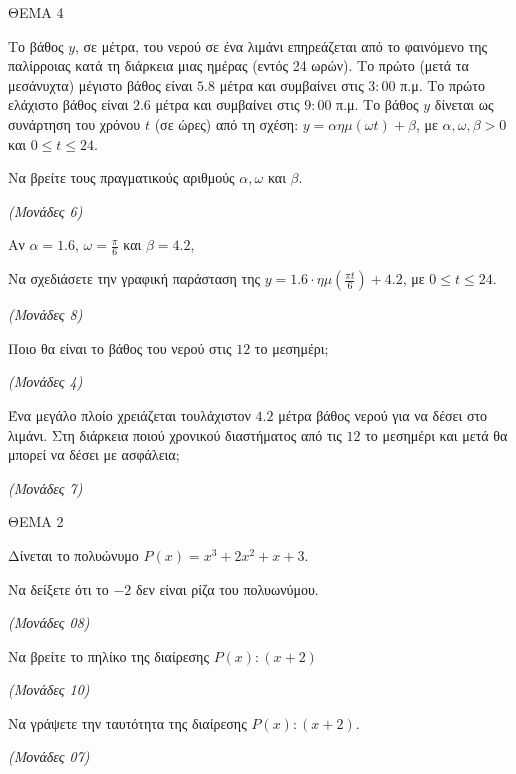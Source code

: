 \documentclass[11pt,a4paper,twoside]{book}
\newcommand{\monades}[1]{\hfill \textit{(Μονάδες #1)}}
\begin{document}
ΘΕΜΑ 4

Το βάθος $y$, σε μέτρα, του νερού σε ένα λιμάνι επηρεάζεται από το φαινόμενο της παλίρροιας κατά τη διάρκεια μιας ημέρας (εντός 24 ωρών). Το πρώτο (μετά τα μεσάνυχτα) μέγιστο βάθος είναι $5.8$ μέτρα και συμβαίνει στις $3:00$ π.μ. Το πρώτο ελάχιστο βάθος είναι $2.6$ μέτρα και συμβαίνει στις $9:00$ π.μ. Το βάθος $y$ δίνεται ως συνάρτηση του χρόνου $t$ (σε ώρες) από τη σχέση: $y = \alpha\eta\mu(\omega t) + \beta$, με $\alpha, \omega, \beta > 0$ και $0 \le t \le 24$.

\begin{alist}
\item Να βρείτε τους πραγματικούς αριθμούς $\alpha, \omega$ και $\beta$.

\monades{6}

\item Αν $\alpha = 1.6$, $\omega = \frac{\pi}{6}$ και $\beta = 4.2$,

\begin{rlist}
\item Να σχεδιάσετε την γραφική παράσταση της $y = 1.6\cdot\eta\mu\left(\frac{\pi t}{6}\right) + 4.2$, με $0 \le t \le 24$.

\monades{8}

\item Ποιο θα είναι το βάθος του νερού στις $12$ το μεσημέρι;

\monades{4}

\item Ένα μεγάλο πλοίο χρειάζεται τουλάχιστον $4.2$ μέτρα βάθος νερού για να δέσει στο λιμάνι. Στη διάρκεια ποιού χρονικού διαστήματος από τις $12$ το μεσημέρι και μετά θα μπορεί να δέσει με ασφάλεια;

\monades{7}
\end{rlist}
\end{alist}

\vspace{4mm}

ΘΕΜΑ 2

Δίνεται το πολυώνυμο $P(x) = x^{3} + 2x^{2} + x + 3$.

\begin{alist}
\item Να δείξετε ότι το $- 2$ δεν είναι ρίζα του πολυωνύμου.

\monades{08}

\item Να βρείτε το πηλίκο της διαίρεσης $P(x):(x + 2)$

\monades{10}

\item Να γράψετε την ταυτότητα της διαίρεσης $P(x):(x + 2)$.

\monades{07}
\end{alist}
\end{document}
